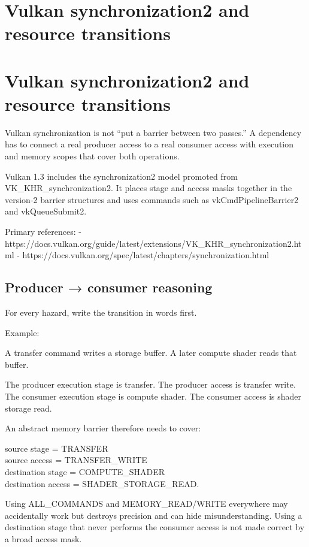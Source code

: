 \hypertarget{appendix-f15ce0d9c170}{}
\section*{Vulkan synchronization2 and resource transitions}
\section{Vulkan synchronization2 and resource transitions}\label{appendix-f15ce0d9c170-vulkan-synchronization2-and-resource-transitions}

Vulkan synchronization is not ``put a barrier between two passes.'' A dependency has to connect a real producer access to a real consumer access with execution and memory scopes that cover both operations.

Vulkan 1.3 includes the synchronization2 model promoted from VK\_KHR\_synchronization2. It places stage and access masks together in the version-2 barrier structures and uses commands such as vkCmdPipelineBarrier2 and vkQueueSubmit2.

Primary references: - https://docs.vulkan.org/guide/latest/extensions/VK\_KHR\_synchronization2.html - https://docs.vulkan.org/spec/latest/chapters/synchronization.html

\subsection{Producer → consumer reasoning}\label{appendix-f15ce0d9c170-producer-consumer-reasoning}

For every hazard, write the transition in words first.

Example:

A transfer command writes a storage buffer. A later compute shader reads that buffer.

The producer execution stage is transfer. The producer access is transfer write. The consumer execution stage is compute shader. The consumer access is shader storage read.

An abstract memory barrier therefore needs to cover:

source stage = TRANSFER\\
source access = TRANSFER\_WRITE\\
destination stage = COMPUTE\_SHADER\\
destination access = SHADER\_STORAGE\_READ.

Using ALL\_COMMANDS and MEMORY\_READ/WRITE everywhere may accidentally work but destroys precision and can hide misunderstanding. Using a destination stage that never performs the consumer access is not made correct by a broad access mask.

